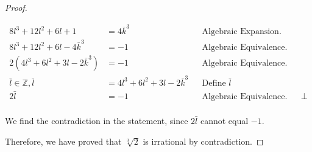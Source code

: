 \documentclass{article}
\newcommand{\AllIntegers}{\mathbb{Z}}
\begin{document}
\begin{proof}
\begin{enumerate}
\begin{align*}
            8l^3 + 12l^2 + 6l + 1 &= 4\bar{k}^3&&\text{Algebraic Expansion.}\\
            8l^3 +12l^2 +6l-4\bar{k}^3 &= -1&&\text{Algebraic Equivalence.}\\
            2(4l^3 + 6l^2 + 3l-2\bar{k}^3) &= -1&&\text{Algebraic Equivalence.}\\
            \bar{l} \in \AllIntegers, \bar{l} &= 4l^3 + 6l^2 + 3l-2\bar{k}^3&&\text{Define } \bar{l}\\
            2\bar{l} &= -1&&\text{Algebraic Equivalence.}
            &&\bot\\
        \end{align*}

        We find the contradiction in the statement, since \(2\bar{l}\) cannot equal \(-1\).
    \end{enumerate}
    Therefore, we have proved that \(\sqrt[3]{2}\) is irrational by contradiction.
\end{proof}
\end{document}
